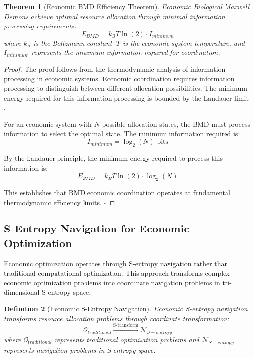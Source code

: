 \documentclass[12pt,a4paper]{article}
\newtheorem{theorem}{Theorem}
\newtheorem{definition}[theorem]{Definition}
\begin{document}
\begin{theorem}[Economic BMD Efficiency Theorem]
Economic Biological Maxwell Demons achieve optimal resource allocation through minimal information processing requirements:
\begin{equation}
E_{BMD} = k_B T \ln(2) \cdot I_{minimum}
\end{equation}
where $k_B$ is the Boltzmann constant, $T$ is the economic system temperature, and $I_{minimum}$ represents the minimum information required for coordination.
\end{theorem}

\begin{proof}
The proof follows from the thermodynamic analysis of information processing in economic systems. Economic coordination requires information processing to distinguish between different allocation possibilities. The minimum energy required for this information processing is bounded by the Landauer limit \cite{landauer1961,bennett1982}.

For an economic system with $N$ possible allocation states, the BMD must process information to select the optimal state. The minimum information required is:
\begin{equation}
I_{minimum} = \log_2(N) \text{ bits}
\end{equation}

By the Landauer principle, the minimum energy required to process this information is:
\begin{equation}
E_{BMD} = k_B T \ln(2) \cdot \log_2(N)
\end{equation}

This establishes that BMD economic coordination operates at fundamental thermodynamic efficiency limits. $\square$
\end{proof}

\subsection{S-Entropy Navigation for Economic Optimization}

Economic optimization operates through S-entropy navigation rather than traditional computational optimization. This approach transforms complex economic optimization problems into coordinate navigation problems in tri-dimensional S-entropy space.

\begin{definition}[Economic S-Entropy Navigation]
Economic S-entropy navigation transforms resource allocation problems through coordinate transformation:
\begin{equation}
\mathcal{O}_{traditional} \xrightarrow{\text{S-transform}} \mathcal{N}_{S-entropy}
\end{equation}
where $\mathcal{O}_{traditional}$ represents traditional optimization problems and $\mathcal{N}_{S-entropy}$ represents navigation problems in S-entropy space.
\end{definition}
\end{document}
